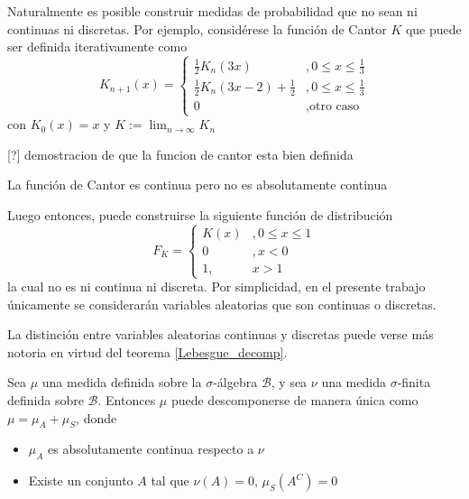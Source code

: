 Naturalmente es posible construir medidas de probabilidad que no sean ni continuas ni discretas. Por ejemplo, considérese la función de Cantor $K$ que puede ser definida iterativamente como
\begin{equation}
K_{n+1}(x) =
\begin{cases}
\frac{1}{2} K_n(3 x) &, 0\leq x \leq \frac{1}{3} \\
\frac{1}{2} K_n(3 x-2) + \frac{1}{2} &, 0\leq x \leq \frac{1}{3} \\
0 &, \text{otro caso}
\end{cases}
\end{equation}
con $K_0(x) = x$ y $K := \lim_{n\rightarrow \infty} K_n$

[?] demostracion de que la funcion de cantor esta bien definida

\begin{proposicion}
La función de Cantor es continua pero no es absolutamente continua
\end{proposicion}

Luego entonces, puede construirse la siguiente función de distribución
\begin{equation}
F_K = \begin{cases}
K(x) &, 0\leq x \leq 1 \\
0 &, x < 0 \\
1 ,& x > 1
\end{cases}
\end{equation}
la cual no es ni continua ni discreta. Por simplicidad, en el presente trabajo únicamente se considerarán variables aleatorias que son continuas o discretas.

La distinción entre variables aleatorias continuas y discretas puede verse más notoria en virtud del teorema \ref{Lebesgue_decomp}.

\begin{teorema}
Sea $\mu$ una medida definida sobre la $\sigma$-álgebra $\mathcal{B}$, y sea $\nu$ una medida 
$\sigma$-finita definida sobre $\mathcal{B}$. Entonces $\mu$ puede descomponerse de manera única como
$\mu = \mu_A + \mu_S$, donde
\begin{itemize}
\item $\mu_A$ es absolutamente continua respecto a $\nu$
\item Existe un conjunto $A$ tal que $\nu(A)=0$, $\mu_S\left(A^{C}\right) = 0$
\end{itemize}
\label{Lebesgue_decomp}
\end{teorema}

